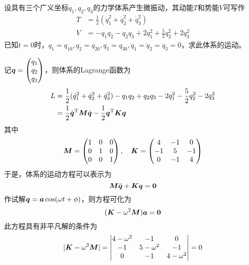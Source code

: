 \begin{question}
设具有三个广义坐标$q_1,q_2,q_3$的力学体系产生微振动，其动能$T$和势能$V$可写作
\begin{align*}
	T & = \frac12 (\dot{q}_1^2 + \dot{q}_2^2 + \dot{q}_3^2) \\
	V & = -q_1q_2 - q_2q_3 + 2q_1^2 + \frac52 q_2^2 + 2q_3^2
\end{align*}
已知$t=0$时，$q_1 = q_{10},q_2 = q_{20},q_3 = q_{30},\dot{q}_1 = \dot{q}_2 = \dot{q}_3 = 0$，求此体系的运动。
\end{question}
\begin{solution}
记$\boldsymbol{q}=\begin{pmatrix} q_1 \\ q_2 \\ q_3 \end{pmatrix}$，则体系的Lagrange函数为
\begin{align*}
	L & = \frac12 (\dot{q}_1^2 + \dot{q}_2^2 + \dot{q}_3^2) - q_1q_2 + q_2q_3 - 2q_1^2 - \frac52 q_2^2 - 2q_3^2 \\
	& = \frac12 \dot{\boldsymbol{q}}^{\mathrm{T}} \boldsymbol{M} \dot{\boldsymbol{q}} - \frac12 \boldsymbol{q}^{\mathrm{T}} \boldsymbol{K} \boldsymbol{q}
\end{align*}
其中
\begin{equation*}
	\boldsymbol{M} = \begin{pmatrix} 1 & 0 & 0 \\ 0 & 1 & 0 \\ 0 & 0 & 1 \end{pmatrix},\quad \boldsymbol{K} = \begin{pmatrix} 4 & -1 & 0 \\ -1 & 5 & -1 \\ 0 & -1 & 4 \end{pmatrix}
\end{equation*}
于是，体系的运动方程可以表示为
\begin{equation*}
	\boldsymbol{M} \ddot{\boldsymbol{q}} + \boldsymbol{K} \boldsymbol{q} = \boldsymbol{0}
\end{equation*}
作试解$\boldsymbol{q} = \boldsymbol{a} \cos (\omega t+\phi)$，则方程可化为
\begin{equation*}
	(\boldsymbol{K}-\omega^2 \boldsymbol{M}) \boldsymbol{a} = \boldsymbol{0}
\end{equation*}
此方程具有非平凡解的条件为
\begin{equation*}
	|\mbf{K}-\omega^2 \mbf{M}| = \begin{vmatrix} 4-\omega^2 & -1 & 0 \\ -1 & 5-\omega^2 & -1 \\ 0 & -1 & 4-\omega^2 \end{vmatrix} = 0

\end{equation*}
\end{solution}
